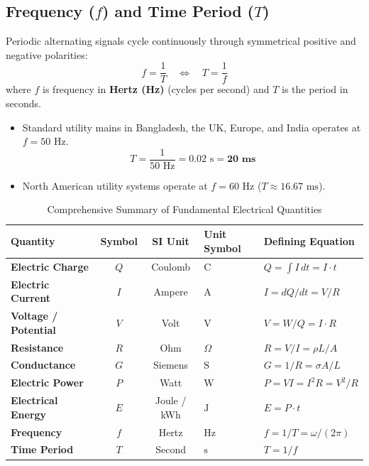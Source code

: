 \subsection{Frequency ($f$) and Time Period ($T$)}
Periodic alternating signals cycle continuously through symmetrical positive and negative polarities:
\begin{equation}
\label{eq:frequency_period}
\boxed{f = \frac{1}{T} \quad \Longleftrightarrow \quad T = \frac{1}{f}}
\end{equation}
where $f$ is frequency in \textbf{Hertz (Hz)} (cycles per second) and $T$ is the period in seconds.
\begin{itemize}
    \item Standard utility mains in Bangladesh, the UK, Europe, and India operates at $f = 50\text{ Hz}$.
    \[ T = \frac{1}{50\text{ Hz}} = 0.02\text{ s} = \mathbf{20\text{ ms}} \]
    \item North American utility systems operate at $f = 60\text{ Hz}$ ($T \approx 16.67\text{ ms}$).
\end{itemize}

\begin{table}[htbp]
\centering
\small
\caption{Comprehensive Summary of Fundamental Electrical Quantities}
\label{tab:electrical_quantities_summary}
\begin{tabularx}{\textwidth}{l c c l X}
\toprule
\textbf{Quantity} & \textbf{Symbol} & \textbf{SI Unit} & \textbf{Unit Symbol} & \textbf{Defining Equation} \\
\midrule
\textbf{Electric Charge} & $Q$ & Coulomb & $\text{C}$ & $Q = \int I\,dt = I \cdot t$ \\
\textbf{Electric Current} & $I$ & Ampere & $\text{A}$ & $I = dQ/dt = V/R$ \\
\textbf{Voltage / Potential} & $V$ & Volt & $\text{V}$ & $V = W/Q = I \cdot R$ \\
\textbf{Resistance} & $R$ & Ohm & $\Omega$ & $R = V/I = \rho L/A$ \\
\textbf{Conductance} & $G$ & Siemens & $\text{S}$ & $G = 1/R = \sigma A/L$ \\
\textbf{Electric Power} & $P$ & Watt & $\text{W}$ & $P = VI = I^2R = V^2/R$ \\
\textbf{Electrical Energy} & $E$ & Joule / kWh & $\text{J}$ & $E = P \cdot t$ \\
\textbf{Frequency} & $f$ & Hertz & $\text{Hz}$ & $f = 1/T = \omega / (2\pi)$ \\
\textbf{Time Period} & $T$ & Second & $\text{s}$ & $T = 1/f$ \\
\bottomrule
\end{tabularx}
\end{table}



